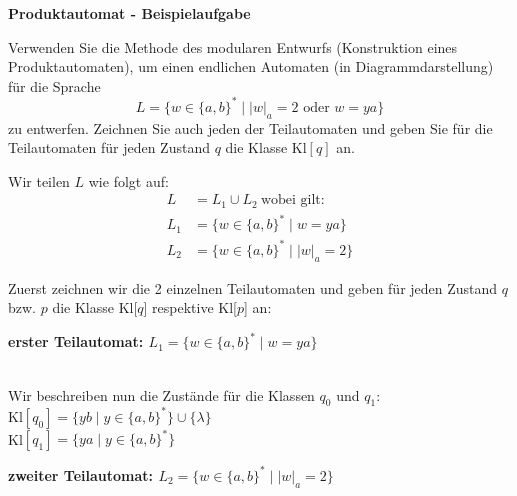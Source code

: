 \documentclass[a4paper, 11pt]{article}
\newcommand\myTitle[1]{{\large \textbf {#1}}}
\begin{document}
    \myTitle{Produktautomat - Beispielaufgabe}

    Verwenden Sie die Methode des modularen Entwurfs (Konstruktion eines Produktautomaten), um einen endlichen Automaten (in Diagrammdarstellung) für die Sprache 
    $$L = \{w \in \{a, b\}^* \mid |w|_a = 2 \text{ oder } w = ya\}$$
    zu entwerfen. Zeichnen Sie auch jeden der Teilautomaten und geben Sie für die Teilautomaten für jeden Zustand $q$ die Klasse Kl$[q]$ an.

    Wir teilen $L$ wie folgt auf:
    \begin{align*}
        L &= L_1 \cup L_2 \ \text{wobei gilt:} \\
        L_1 &= \{w \in \{a,b\}^* \mid w = ya\} \\
        L_2 &= \{w \in \{a,b\}^* \mid |w|_a = 2\}
    \end{align*}
    
    Zuerst zeichnen wir die 2 einzelnen Teilautomaten und geben für jeden Zustand $q$ bzw. $p$ die Klasse Kl[$q$] respektive Kl[$p$] an:

    \textbf{erster Teilautomat: $L_1 = \{w \in \{a,b\}^* \mid  w = ya\}$}
    \\Wir beschreiben nun die Zustände für die Klassen $q_0$ und $q_1$: \\
    Kl$[q_0] = \{ yb \mid y \in \{a,b\}^* \} \cup \{\lambda\}$ \\
    Kl$[q_1] = \{ya\mid  y \in \{a,b\}^*  \}$ 

    \textbf{zweiter Teilautomat: $L_2 = \{w \in \{a,b\}^* \mid |w|_a = 2\}$}

\end{document}
